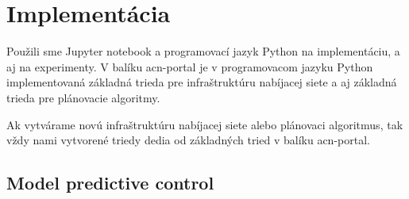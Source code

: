 \chapter{Implementácia}




Použili sme Jupyter notebook a programovací jazyk Python na implementáciu, a aj na experimenty. V balíku acn-portal je v programovacom jazyku Python implementovaná základná trieda pre infraštruktúru nabíjacej siete a aj základná trieda pre plánovacie algoritmy.

Ak vytvárame novú infraštruktúru nabíjacej siete alebo plánovaci algoritmus, tak vždy nami vytvorené triedy dedia od základných tried v balíku acn-portal.
\section{Model predictive control}







